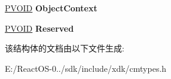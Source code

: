 \begin{DoxyCompactItemize}
\item 
\mbox{\label{struct___r_e_g___p_o_s_t___o_p_e_r_a_t_i_o_n___i_n_f_o_r_m_a_t_i_o_n_a676dffde209b965ca07aebe7e9f192c0}} 
\hyperlink{interfacevoid}{P\+V\+O\+ID} {\bfseries Object\+Context}
\item 
\mbox{\label{struct___r_e_g___p_o_s_t___o_p_e_r_a_t_i_o_n___i_n_f_o_r_m_a_t_i_o_n_a3fcf535702b022b8326cfadcb0226ea9}} 
\hyperlink{interfacevoid}{P\+V\+O\+ID} {\bfseries Reserved}
\end{DoxyCompactItemize}


该结构体的文档由以下文件生成\+:\begin{DoxyCompactItemize}
\item 
E\+:/\+React\+O\+S-\/0../sdk/include/xdk/cmtypes.\+h\end{DoxyCompactItemize}
